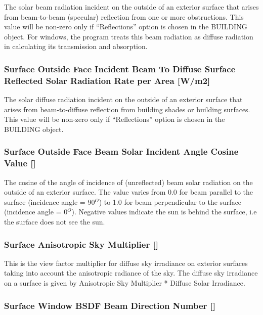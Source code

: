 The solar beam radiation incident on the outside of an exterior surface that arises from beam-to-beam (specular) reflection from one or more obstructions. This value will be non-zero only if ``Reflections'' option is chosen in the BUILDING object. For windows, the program treats this beam radiation as diffuse radiation in calculating its transmission and absorption.

\subsubsection{Surface Outside Face Incident Beam To Diffuse Surface Reflected Solar Radiation Rate per Area {[}W/m2{]}}\label{surface-outside-face-incident-beam-to-diffuse-surface-reflected-solar-radiation-rate-per-area-wm2}

The solar diffuse radiation incident on the outside of an exterior surface that arises from beam-to-diffuse reflection from building shades or building surfaces. This value will be non-zero only if ``Reflections'' option is chosen in the BUILDING object.

\subsubsection{Surface Outside Face Beam Solar Incident Angle Cosine Value {[]}}\label{surface-outside-face-beam-solar-incident-angle-cosine-value}

The cosine of the angle of incidence of (unreflected) beam solar radiation on the outside of an exterior surface. The value varies from 0.0 for beam parallel to the surface (incidence angle = 90\(^{O}\)) to 1.0 for beam perpendicular to the surface (incidence angle = 0\(^{O}\)). Negative values indicate the sun is behind the surface, i.e the surface does not see the sun.

\subsubsection{Surface Anisotropic Sky Multiplier {[]}}\label{surface-anisotropic-sky-multiplier}

This is the view factor multiplier for diffuse sky irradiance on exterior surfaces taking into account the anisotropic radiance of the sky. The diffuse sky irradiance on a surface is given by Anisotropic Sky Multiplier * Diffuse Solar Irradiance.

\subsubsection{Surface Window BSDF Beam Direction Number {[]}}\label{surface-window-bsdf-beam-direction-number}

